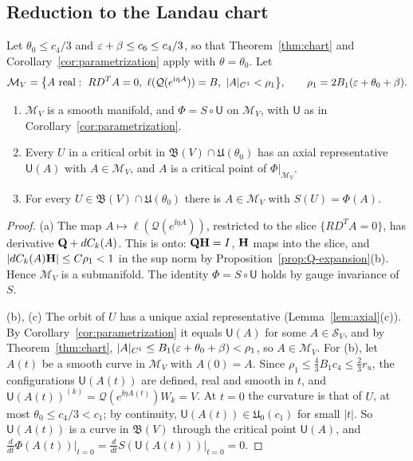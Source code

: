 \subsection{Reduction to the Landau chart}\label{subsec:reduction}

Let $\theta_0\le c_4/3$ and $\varepsilon+\beta\le c_6\le c_4/3$, so that Theorem~\ref{thm:chart} and Corollary~\ref{cor:parametrization} apply with $\theta=\theta_0$. Let
\[
\mathcal M_V=\big\{A\ \text{real}:\ RD^TA=0,\ \ell(\mathcal Q(e^{\ii\eta A}))=B,\ |A|_{C^1}<\rho_1\big\},\qquad\rho_1=2B_1(\eps+\theta_0+\beta).
\]

\begin{lemma}\label{lem:reduction}
\begin{enumerate}[label=(\alph*)]
\item $\mathcal M_V$ is a smooth manifold, and $\Phi=S\circ\mathsf U$ on $\mathcal M_V$, with $\mathsf U$ as in Corollary~\ref{cor:parametrization}.
\item Every $U$ in a critical orbit in $\mathfrak B(V)\cap\mathfrak U(\theta_0)$ has an axial representative $\mathsf U(A)$ with $A\in\mathcal M_V$, and $A$ is a critical point of $\Phi|_{\mathcal M_V}$.
\item For every $U\in\mathfrak B(V)\cap\mathfrak U(\theta_0)$ there is $A\in\mathcal M_V$ with $S(U)=\Phi(A)$.
\end{enumerate}
\end{lemma}

\begin{proof}
(a) The map $A\mapsto\ell(\mathcal Q(e^{\ii\eta A}))$, restricted to the slice $\{RD^TA=0\}$, has derivative $\mathbf Q+dC_k(A)$. This is onto: $\mathbf Q\mathbf H=I$, $\mathbf H$ maps into the slice, and $|dC_k(A)\mathbf H|\le C\rho_1<1$ in the sup norm by Proposition~\ref{prop:Q-expansion}(b). Hence $\mathcal M_V$ is a submanifold. The identity $\Phi=S\circ\mathsf U$ holds by gauge invariance of $S$.

(b), (c) The orbit of $U$ has a unique axial representative (Lemma~\ref{lem:axial}(c)). By Corollary~\ref{cor:parametrization} it equals $\mathsf U(A)$ for some $A\in\mathcal S_V$, and by Theorem~\ref{thm:chart}, $|A|_{C^1}\le B_1(\varepsilon+\theta_0+\beta)<\rho_1$, so $A\in\mathcal M_V$. For (b), let $A(t)$ be a smooth curve in $\mathcal M_V$ with $A(0)=A$. Since $\rho_1\le\frac43B_1c_4\le\frac23r_u$, the configurations $\mathsf U(A(t))$ are defined, real and smooth in $t$, and $\mathsf U(A(t))^{(k)}=\mathcal Q(e^{\ii\eta A(t)})W_k=V$. At $t=0$ the curvature is that of $U$, at most $\theta_0\le c_4/3<c_1$; by continuity, $\mathsf U(A(t))\in\mathfrak U_0(c_1)$ for small $|t|$. So $\mathsf U(A(t))$ is a curve in $\mathfrak B(V)$ through the critical point $\mathsf U(A)$, and $\frac{d}{dt}\Phi(A(t))\big|_{t=0}=\frac{d}{dt}S(\mathsf U(A(t)))\big|_{t=0}=0$.
\end{proof}

